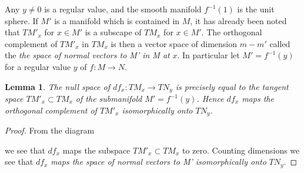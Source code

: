 \documentclass[12pt, openany, closeany]{book}
\newtheorem{lemma}{Lemma}
\theoremstyle{corollary}
\begin{document}
    Any $y \neq 0$ is a regular value, and the smooth manifold $f^{-1}(1)$ is the unit sphere.
    If $M'$ is a manifold which is contained in $M$, it has already been noted that $TM'_{x}$ for $x\in M'$ is a subscape of $TM_{x}$ for $x\in M'$. The orthogonal complement of $TM'_{x}$ in $TM_{x}$ is then a vector space of dimension $m - m'$ called the \emph{the space of normal vectors to M' in M at} $x$.
    In particular let $M' = f^{-1}(y)$ for a regular value $y$ of $f: M \to N$.
  \begin{lemma} The null space of $df_{x} : TM_{x} \to TN_{y}$ is precisely equal to the tangent space $TM'_{x} \subset TM_{x}$ of the submanifold $M' = f^{-1}(y)$. Hence $df_{x}$ maps the orthogonal complement of $TM'_{x}$ isomorphically onto $TN_{y}$.

  \end{lemma}
  \begin{proof} From the diagram \\
    \begin{center}
    \end{center}
    we see that $df_{x}$ maps the subspace $TM'_{x} \subset TM_{x}$ to zero. Counting dimensions we see that $df_{x}$ \emph{maps the space of normal vectors to M' isomorphically onto} $TN_{y}$.
  \end{proof}
\end{document}
